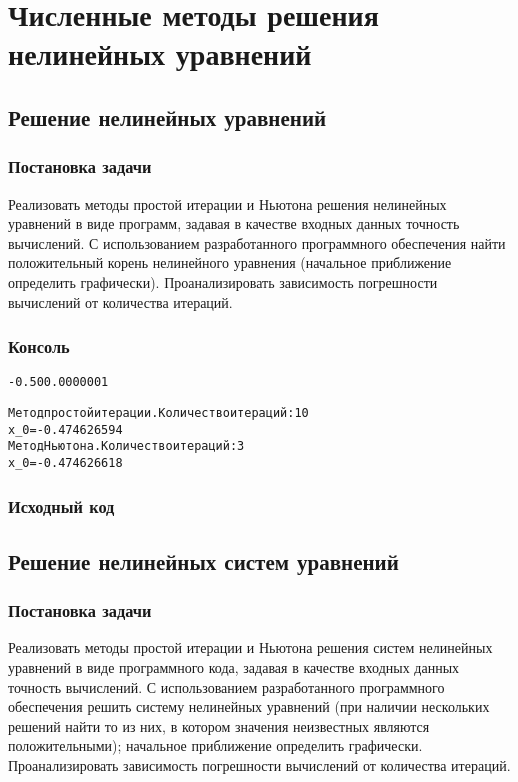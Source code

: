\section{Численные методы решения нелинейных уравнений}

\subsection{Решение нелинейных уравнений}

\subsubsection{Постановка задачи}
Реализовать методы простой итерации и Ньютона решения нелинейных уравнений в виде программ, задавая в качестве входных данных точность вычислений. С использованием разработанного программного обеспечения найти положительный корень нелинейного уравнения (начальное приближение определить графически). Проанализировать зависимость погрешности вычислений от количества итераций.

\subsubsection{Консоль}
\begin{alltt}
-0.5 0 0.0000001

Метод простой итерации. Количество итераций: 10
x_0 = -0.474626594
Метод Ньютона. Количество итераций: 3
x_0 = -0.474626618
\end{alltt}
\pagebreak

\subsubsection{Исходный код}

\pagebreak

\subsection{Решение нелинейных систем уравнений}

\subsubsection{Постановка задачи}
Реализовать методы простой итерации и Ньютона решения систем нелинейных уравнений в виде программного кода, задавая в качестве входных данных точность вычислений. С использованием разработанного программного обеспечения решить систему нелинейных уравнений (при наличии нескольких решений найти то из них, в котором значения неизвестных являются положительными); начальное приближение определить графически. Проанализировать зависимость погрешности вычислений от количества итераций.

